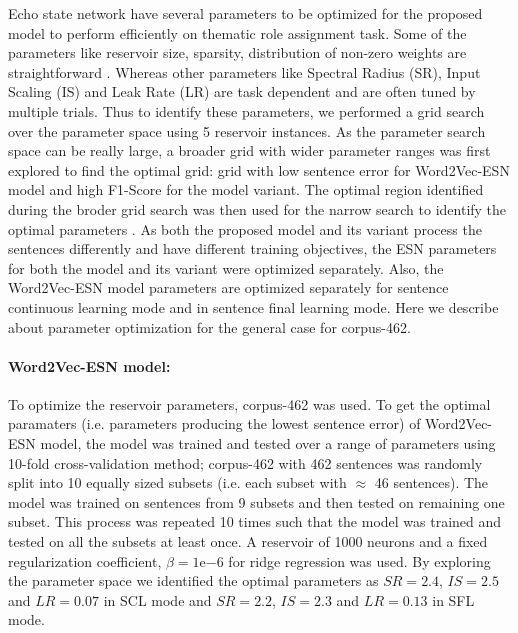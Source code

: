 Echo state network have several parameters to be optimized for the proposed model to perform efficiently on thematic role assignment task. Some of the parameters like reservoir size, sparsity, distribution of non-zero weights are straightforward \cite{esn:practical_guide}. Whereas other parameters like Spectral Radius (SR), Input Scaling (IS) and Leak Rate (LR) are task dependent and are often tuned by multiple trials. Thus to identify these parameters, we performed a grid search over the parameter space using 5 reservoir instances. As the parameter search space can be really large, a broader grid with wider parameter ranges was first explored to find the optimal grid: grid with low sentence error for Word2Vec-ESN model and high F1-Score for the model variant. The optimal region identified during the broder grid search was then used for the narrow search to identify the optimal parameters \cite{esn:practical_guide}. As both the proposed model and its variant process the sentences differently and have different training objectives, the ESN parameters for both the model and its variant were optimized separately. Also, the Word2Vec-ESN model parameters are optimized separately for sentence continuous learning mode and in sentence final learning mode. Here we describe about parameter optimization for the general case for corpus-462. 

\paragraph{Word2Vec-ESN model:} To optimize the reservoir parameters, corpus-462 was used. To get the optimal paramaters (i.e. parameters producing the lowest sentence error) of Word2Vec-ESN model, the model was trained and tested over a range of parameters using 10-fold cross-validation method; corpus-462 with 462 sentences was randomly split into 10 equally sized subsets (i.e. each subset with $\approx$ 46 sentences). The model was trained on sentences from 9 subsets and then tested on remaining one subset. This process was repeated 10 times such that the model was trained and tested on all the subsets at least once. A reservoir of 1000 neurons and a fixed regularization coefficient, $\beta = 1\mathrm{e}{-6}$ for ridge regression was used. By exploring the parameter space we identified the optimal parameters as $SR = 2.4$, $IS = 2.5$ and $LR = 0.07$ in SCL mode and $SR = 2.2$, $IS = 2.3$ and $LR = 0.13$ in SFL mode.   

